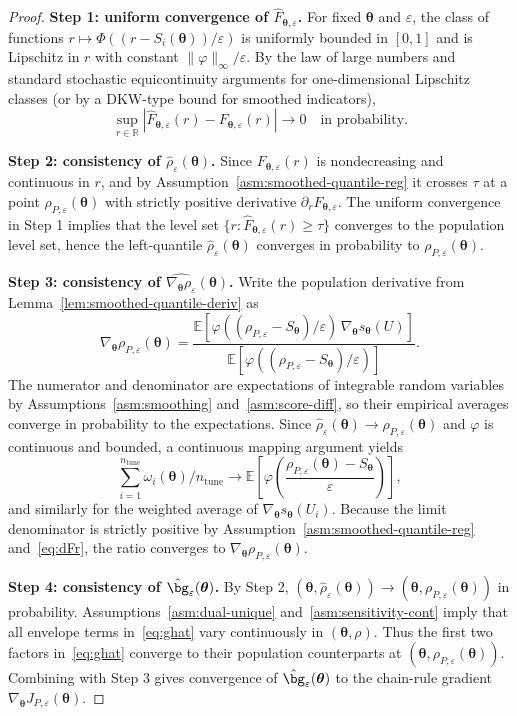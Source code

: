 \documentclass[11pt]{article}
\newcommand{\R}{\mathbb{R}}
\newcommand{\E}{\mathbb{E}}
\newcommand{\abs}[1]{\left|#1\right|}
\newcommand{\btheta}{\bm{\theta}}
\theoremstyle{plain}
\theoremstyle{definition}
\begin{document}
\begin{proof}
\textbf{Step 1: uniform convergence of $\hat F_{\btheta,\varepsilon}$.}
For fixed $\btheta$ and $\varepsilon$, the class of functions
$r\mapsto \Phi((r-S_i(\btheta))/\varepsilon)$ is uniformly bounded in $[0,1]$ and is Lipschitz in $r$ with constant $\|\varphi\|_{\infty}/\varepsilon$.
By the law of large numbers and standard stochastic equicontinuity arguments for one-dimensional Lipschitz classes (or by a DKW-type bound for smoothed indicators),
\[
\sup_{r\in \R}\abs{\hat F_{\btheta,\varepsilon}(r)-F_{\btheta,\varepsilon}(r)}\to 0
\quad\text{in probability.}
\]

\textbf{Step 2: consistency of $\hat\rho_{\varepsilon}(\btheta)$.}
Since $F_{\btheta,\varepsilon}(r)$ is nondecreasing and continuous in $r$, and by Assumption~\ref{asm:smoothed-quantile-reg} it crosses $\tau$ at a point
$\rho_{P,\varepsilon}(\btheta)$ with strictly positive derivative $\partial_r F_{\btheta,\varepsilon}$.
The uniform convergence in Step 1 implies that the level set $\{r:\hat F_{\btheta,\varepsilon}(r)\ge \tau\}$ converges to the population level set,
hence the left-quantile $\hat\rho_{\varepsilon}(\btheta)$ converges in probability to $\rho_{P,\varepsilon}(\btheta)$.

\textbf{Step 3: consistency of $\widehat{\nabla_{\btheta}\rho_{\varepsilon}}(\btheta)$.}
Write the population derivative from Lemma~\ref{lem:smoothed-quantile-deriv} as
\[
\nabla_{\btheta}\rho_{P,\varepsilon}(\btheta)
=
\frac{\E[\varphi((\rho_{P,\varepsilon}-S_{\btheta})/\varepsilon)\,\nabla_{\btheta}s_{\btheta}(U)]}
{\E[\varphi((\rho_{P,\varepsilon}-S_{\btheta})/\varepsilon)]}.
\]
The numerator and denominator are expectations of integrable random variables by Assumptions~\ref{asm:smoothing} and~\ref{asm:score-diff},
so their empirical averages converge in probability to the expectations.
Since $\hat\rho_{\varepsilon}(\btheta)\to \rho_{P,\varepsilon}(\btheta)$ and $\varphi$ is continuous and bounded,
a continuous mapping argument yields
\[
\sum_{i=1}^{n_{\mathrm{tune}}}\omega_i(\btheta)\Big/ n_{\mathrm{tune}}
\to
\E\left[\varphi\left(\frac{\rho_{P,\varepsilon}(\btheta)-S_{\btheta}}{\varepsilon}\right)\right],
\]
and similarly for the weighted average of $\nabla_{\btheta}s_{\btheta}(U_i)$.
Because the limit denominator is strictly positive by Assumption~\ref{asm:smoothed-quantile-reg} and~\eqref{eq:dFr},
the ratio converges to $\nabla_{\btheta}\rho_{P,\varepsilon}(\btheta)$.

\textbf{Step 4: consistency of $\hat{\bg}_{\varepsilon}(\btheta)$.}
By Step 2, $(\btheta,\hat\rho_{\varepsilon}(\btheta))\to (\btheta,\rho_{P,\varepsilon}(\btheta))$ in probability.
Assumptions~\ref{asm:dual-unique} and~\ref{asm:sensitivity-cont} imply that all envelope terms in~\eqref{eq:ghat} vary continuously in $(\btheta,\rho)$.
Thus the first two factors in~\eqref{eq:ghat} converge to their population counterparts at $(\btheta,\rho_{P,\varepsilon}(\btheta))$.
Combining with Step 3 gives convergence of $\hat{\bg}_{\varepsilon}(\btheta)$ to the chain-rule gradient $\nabla_{\btheta}J_{P,\varepsilon}(\btheta)$.
\end{proof}
\end{document}
